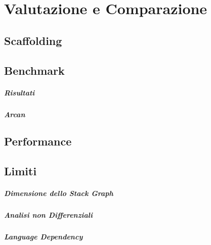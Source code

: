 \chapter{Valutazione e Comparazione}

\section{Scaffolding}

\section{Benchmark}

\paragraph{Risultati}

\paragraph{Arcan}

\section{Performance}

\section{Limiti}

\paragraph{Dimensione dello Stack Graph}

\paragraph{Analisi non Differenziali}

\paragraph{Language Dependency}
